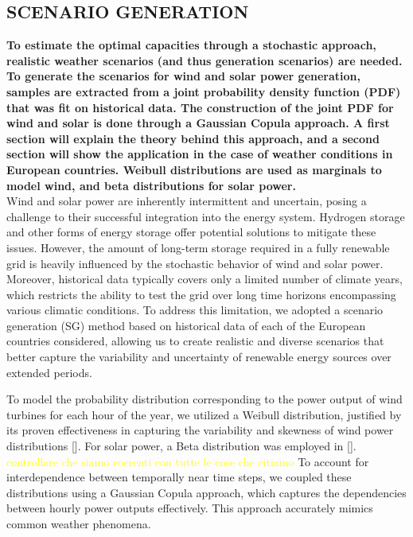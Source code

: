 \subsection{SCENARIO GENERATION}
\textbf{To estimate the optimal capacities through a stochastic approach, realistic weather scenarios (and thus
generation scenarios) are needed. To generate the scenarios for wind and solar power generation, samples
are extracted from a joint probability density function (PDF) that was fit on historical data. The
construction of the joint PDF for wind and solar is done through a Gaussian Copula approach.
A first section will explain the theory behind this approach, and a second section will show the
application in the case of weather conditions in European countries. Weibull distributions are used as
marginals to model wind, and beta distributions for solar power.}\\


Wind and solar power are inherently intermittent and uncertain, posing a challenge to their successful integration into the energy system. Hydrogen storage and other forms of energy storage offer potential solutions to mitigate these issues. However, the amount of long-term storage required in a fully renewable grid is heavily influenced by the stochastic behavior of wind and solar power. Moreover, historical data typically covers only a limited number of climate years, which restricts the ability to test the grid over long time horizons encompassing various climatic conditions. To address this limitation, we adopted a scenario generation (SG) method based on historical data of each of the European countries considered, allowing us to create realistic and diverse scenarios that better capture the variability and uncertainty of renewable energy sources over extended periods. 

To model the probability distribution corresponding to the power output of wind turbines for each hour of the year, we utilized a Weibull distribution, justified by its proven effectiveness in capturing the variability and skewness of wind power distributions [\cite{weibullwind}]. For solar power, a Beta distribution was employed in [\cite{betaPV}]. \textcolor{yellow}{controllare che siamo coerenti con tutte le cose che citiamo} To account for interdependence between temporally near time steps, we coupled these distributions using a Gaussian Copula approach, which captures the dependencies between hourly power outputs effectively. This approach accurately mimics common weather phenomena. \\

